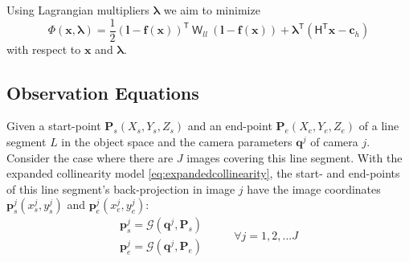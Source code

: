 Using Lagrangian multipliers $\boldsymbol \lambda$ we aim to minimize
\begin{equation}\label{eq:targetequation}
\Phi(\boldsymbol x,\boldsymbol \lambda)=
\dfrac{1}{2}
(\boldsymbol l-\boldsymbol f(\boldsymbol x))^\mathsf{T}\:
\mathsf{W}_{ll}\:
(\boldsymbol l-\boldsymbol f(\boldsymbol x))+
\boldsymbol \lambda^\mathsf{T}
(\mathsf{H^T}\boldsymbol x-\boldsymbol c_h)
\end{equation}
with respect to $\boldsymbol x$ and $\boldsymbol \lambda$.
%


\subsection{Observation Equations}
\label{subsec:ObsEqua}

Given a start-point $\mathbf{P}_s(X_s,Y_s,Z_s)$ and an end-point $\mathbf{P}_e(X_e,Y_e,Z_e)$ of a line segment $L$ in the object space and the camera parameters $\mathbf{q}^j$ of camera $j$. Consider the case where there are $J$ images covering this line segment. With the expanded collinearity model \eqref{eq:expandedcollinearity}, the start- and end-points of this line segment's back-projection in image $j$ have the image coordinates $\mathbf{p}^j_s(x^j_s,y^j_s)$ and $\mathbf{p}^j_e(x^j_e,y^j_e)$:
\begin{equation} \label{eq:obsmodel-collinearity}
\begin{split}
\mathbf{p}^j_s = \mathcal{G}(\mathbf{q}^j,\mathbf{P}_s)\\
\mathbf{p}^j_e = \mathcal{G}(\mathbf{q}^j,\mathbf{P}_e)
\end{split}
\qquad
\begin{split}
\forall j=1,2,...J
\end{split}
\end{equation}

